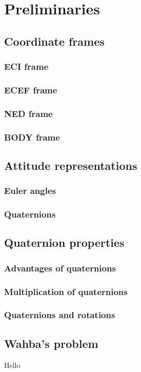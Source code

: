 \documentclass[12pt,a4paper,oneside]{article}
\begin{document}
\newpage
\section{Preliminaries}
\subsection{Coordinate frames}
\subsubsection{ECI frame}
\subsubsection{ECEF frame}
\subsubsection{NED frame}
\subsubsection{BODY frame}
\subsection{Attitude representations}
\subsubsection{Euler angles}
\subsubsection{Quaternions}
\subsection{Quaternion properties}
\subsubsection{Advantages of quaternions}
\subsubsection{Multiplication of quaternions}
\subsubsection{Quaternions and rotations}
\subsection{Wahba's problem}
Hello \cite{RIS_1}
\end{document}
